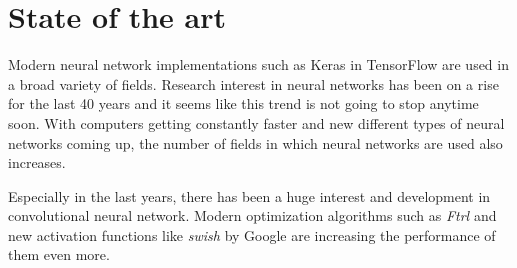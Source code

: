 \section{State of the art}
\label{sec:state-of-the-art}

Modern neural network implementations such as Keras in TensorFlow \cite{tensorflow2015-whitepaper} are used in a broad variety of fields.
Research interest in neural networks has been on a rise for the last 40 years and it seems like this trend is not going to stop anytime soon.
With computers getting constantly faster and new different types of neural networks coming up, the number of fields in which neural networks are used also increases.

Especially in the last years, there has been a huge interest and development in convolutional neural network.
Modern optimization algorithms such as \emph{Ftrl} \cite{McMahan} and new activation functions like \emph{swish} \cite{DBLP:journals/corr/abs-1710-05941} by Google are increasing the performance of them even more.